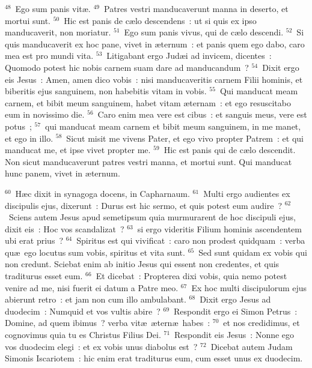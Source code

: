 ${}^{48}$~Ego sum panis vit\ae .
${}^{49}$~Patres vestri manducaverunt manna in deserto, et mortui sunt.
${}^{50}$~Hic est panis de c\ae lo descendens~: ut si quis ex ipso manducaverit, non moriatur.
${}^{51}$~Ego sum panis vivus, qui de c\ae lo descendi.
${}^{52}$~Si quis manducaverit ex hoc pane, vivet in \ae ternum~: et panis quem ego dabo, caro mea est pro mundi vita.
${}^{53}$~Litigabant ergo Jud\ae i ad invicem, dicentes~: Quomodo potest hic nobis carnem suam dare ad manducandum~?
${}^{54}$~Dixit ergo eis Jesus~: Amen, amen dico vobis~: nisi manducaveritis carnem Filii hominis, et biberitis ejus sanguinem, non habebitis vitam in vobis.
${}^{55}$~Qui manducat meam carnem, et bibit meum sanguinem, habet vitam \ae ternam~: et ego resuscitabo eum in novissimo die.
${}^{56}$~Caro enim mea vere est cibus~: et sanguis meus, vere est potus~;
${}^{57}$~qui manducat meam carnem et bibit meum sanguinem, in me manet, et ego in illo.
${}^{58}$~Sicut misit me vivens Pater, et ego vivo propter Patrem~: et qui manducat me, et ipse vivet propter me.
${}^{59}$~Hic est panis qui de c\ae lo descendit. Non sicut manducaverunt patres vestri manna, et mortui sunt. Qui manducat hunc panem, vivet in \ae ternum.


${}^{60}$~H\ae c dixit in synagoga docens, in Capharnaum.
${}^{61}$~Multi ergo audientes ex discipulis ejus, dixerunt~: Durus est hic sermo, et quis potest eum audire~?
${}^{62}$~Sciens autem Jesus apud semetipsum quia murmurarent de hoc discipuli ejus, dixit eis~: Hoc vos scandalizat~?
${}^{63}$~si ergo videritis Filium hominis ascendentem ubi erat prius~?
${}^{64}$~Spiritus est qui vivificat~: caro non prodest quidquam~: verba qu\ae\ ego locutus sum vobis, spiritus et vita sunt.
${}^{65}$~Sed sunt quidam ex vobis qui non credunt. Sciebat enim ab initio Jesus qui essent non credentes, et quis traditurus esset eum.
${}^{66}$~Et dicebat~: Propterea dixi vobis, quia nemo potest venire ad me, nisi fuerit ei datum a Patre meo.
${}^{67}$~Ex hoc multi discipulorum ejus abierunt retro~: et jam non cum illo ambulabant.
${}^{68}$~Dixit ergo Jesus ad duodecim~: Numquid et vos vultis abire~?
${}^{69}$~Respondit ergo ei Simon Petrus~: Domine, ad quem ibimus~? verba vit\ae\ \ae tern\ae\ habes~:
${}^{70}$~et nos credidimus, et cognovimus quia tu es Christus Filius Dei.
${}^{71}$~Respondit eis Jesus~: Nonne ego vos duodecim elegi~: et ex vobis unus diabolus est~?
${}^{72}$~Dicebat autem Judam Simonis Iscariotem~: hic enim erat traditurus eum, cum esset unus ex duodecim.

